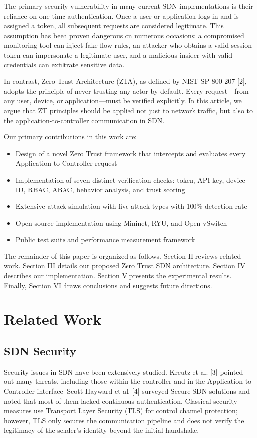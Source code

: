 \documentclass[conference]{IEEEtran}
\begin{document}
The primary security vulnerability in many current SDN implementations is their reliance on one-time authentication. Once a user or application logs in and is assigned a token, all subsequent requests are considered legitimate. This assumption has been proven dangerous on numerous occasions: a compromised monitoring tool can inject fake flow rules, an attacker who obtains a valid session token can impersonate a legitimate user, and a malicious insider with valid credentials can exfiltrate sensitive data.

In contrast, Zero Trust Architecture (ZTA), as defined by NIST SP 800-207 [2], adopts the principle of never trusting any actor by default. Every request—from any user, device, or application—must be verified explicitly. In this article, we argue that ZT principles should be applied not just to network traffic, but also to the application-to-controller communication in SDN.

Our primary contributions in this work are:
\begin{itemize}
\item Design of a novel Zero Trust framework that intercepts and evaluates every Application-to-Controller request
\item Implementation of seven distinct verification checks: token, API key, device ID, RBAC, ABAC, behavior analysis, and trust scoring
\item Extensive attack simulation with five attack types with 100\% detection rate
\item Open-source implementation using Mininet, RYU, and Open vSwitch
\item Public test suite and performance measurement framework
\end{itemize}

The remainder of this paper is organized as follows. Section II reviews related work. Section III details our proposed Zero Trust SDN architecture. Section IV describes our implementation. Section V presents the experimental results. Finally, Section VI draws conclusions and suggests future directions.

\section{Related Work}

\subsection{SDN Security}
Security issues in SDN have been extensively studied. Kreutz et al. [3] pointed out many threats, including those within the controller and in the Application-to-Controller interface. Scott-Hayward et al. [4] surveyed Secure SDN solutions and noted that most of them lacked continuous authentication. Classical security measures use Transport Layer Security (TLS) for control channel protection; however, TLS only secures the communication pipeline and does not verify the legitimacy of the sender's identity beyond the initial handshake.
\end{document}
